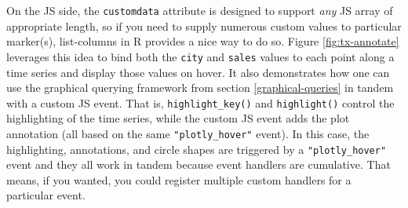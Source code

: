 \documentclass[
  12pt,
]{krantz}
\newenvironment{Shaded}{\begin{snugshade}}{\end{snugshade}}
\newcommand{\DataTypeTok}[1]{\textcolor[rgb]{0.13,0.29,0.53}{#1}}
\newcommand{\KeywordTok}[1]{\textcolor[rgb]{0.13,0.29,0.53}{\textbf{#1}}}
\newcommand{\NormalTok}[1]{#1}
\newcommand{\OperatorTok}[1]{\textcolor[rgb]{0.81,0.36,0.00}{\textbf{#1}}}
\newcommand{\StringTok}[1]{\textcolor[rgb]{0.31,0.60,0.02}{#1}}
\begin{document}
On the JS side, the \texttt{customdata} attribute is designed to support \emph{any} JS array of appropriate length, so if you need to supply numerous custom values to particular marker(s), list-columns in R provides a nice way to do so. Figure \ref{fig:tx-annotate} leverages this idea to bind both the \texttt{city} and \texttt{sales} values to each point along a time series and display those values on hover. It also demonstrates how one can use the graphical querying framework from section \ref{graphical-queries} in tandem with a custom JS event. That is, \texttt{highlight\_key()} and \texttt{highlight()} control the highlighting of the time series, while the custom JS event adds the plot annotation (all based on the same \texttt{"plotly\_hover"} event). In this case, the highlighting, annotations, and circle shapes are triggered by a \texttt{"plotly\_hover"} event and they all work in tandem because event handlers are cumulative. That means, if you wanted, you could register multiple custom handlers for a particular event.

\begin{Shaded}
\end{Shaded}
\end{document}
